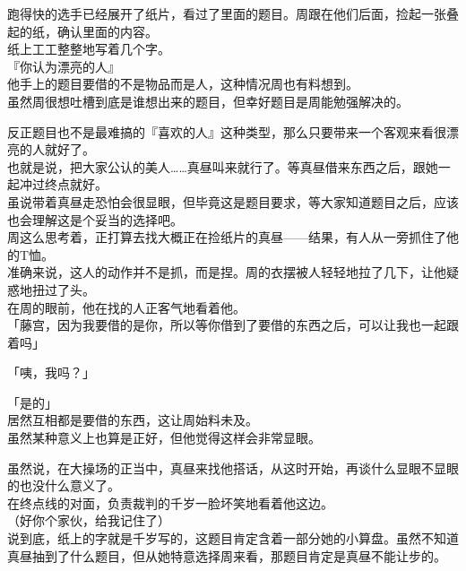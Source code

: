 跑得快的选手已经展开了纸片，看过了里面的题目。周跟在他们后面，捡起一张叠起的纸，确认里面的内容。\\

纸上工工整整地写着几个字。\\

『你认为漂亮的人』\\

他手上的题目要借的不是物品而是人，这种情况周也有料想到。\\

虽然周很想吐槽到底是谁想出来的题目，但幸好题目是周能勉强解决的。

反正题目也不是最难搞的『喜欢的人』这种类型，那么只要带来一个客观来看很漂亮的人就好了。\\

也就是说，把大家公认的美人……真昼叫来就行了。等真昼借来东西之后，跟她一起冲过终点就好。\\

虽说带着真昼走恐怕会很显眼，但毕竟这是题目要求，等大家知道题目之后，应该也会理解这是个妥当的选择吧。\\

周这么思考着，正打算去找大概正在捡纸片的真昼——结果，有人从一旁抓住了他的T恤。\\

准确来说，这人的动作并不是抓，而是捏。周的衣摆被人轻轻地拉了几下，让他疑惑地扭过了头。\\

在周的眼前，他在找的人正客气地看着他。\\

「藤宫，因为我要借的是你，所以等你借到了要借的东西之后，可以让我也一起跟着吗」

「咦，我吗？」

「是的」\\

居然互相都是要借的东西，这让周始料未及。\\

虽然某种意义上也算是正好，但他觉得这样会非常显眼。

虽然说，在大操场的正当中，真昼来找他搭话，从这时开始，再谈什么显眼不显眼的也没什么意义了。\\

在终点线的对面，负责裁判的千岁一脸坏笑地看着他这边。\\

（好你个家伙，给我记住了）\\

说到底，纸上的字就是千岁写的，这题目肯定含着一部分她的小算盘。虽然不知道真昼抽到了什么题目，但从她特意选择周来看，那题目肯定是真昼不能让步的。\\

